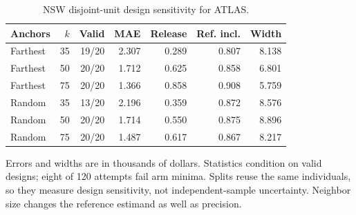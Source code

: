 \begin{table}[htbp]
\centering\small
\setlength{\tabcolsep}{4pt}
\caption{NSW disjoint-unit design sensitivity for ATLAS.}
\label{tab:b-nsw-stability}
\begin{tabular}{lrrrrrr}
\toprule
Anchors & $k$ & Valid & MAE & Release & Ref. incl. & Width \\
\midrule
Farthest & 35 & 19/20 & 2.307 & 0.289 & 0.807 & 8.138 \\
Farthest & 50 & 20/20 & 1.712 & 0.625 & 0.858 & 6.801 \\
Farthest & 75 & 20/20 & 1.366 & 0.858 & 0.908 & 5.759 \\
Random & 35 & 13/20 & 2.196 & 0.359 & 0.872 & 8.576 \\
Random & 50 & 20/20 & 1.714 & 0.550 & 0.875 & 8.896 \\
Random & 75 & 20/20 & 1.487 & 0.617 & 0.867 & 8.217 \\
\bottomrule
\end{tabular}
\par\smallskip\begin{minipage}{0.97\linewidth}\footnotesize Errors and widths are in thousands of dollars. Statistics condition on valid designs; eight of 120 attempts fail arm minima. Splits reuse the same individuals, so they measure design sensitivity, not independent-sample uncertainty. Neighbor size changes the reference estimand as well as precision.\end{minipage}
\end{table}
